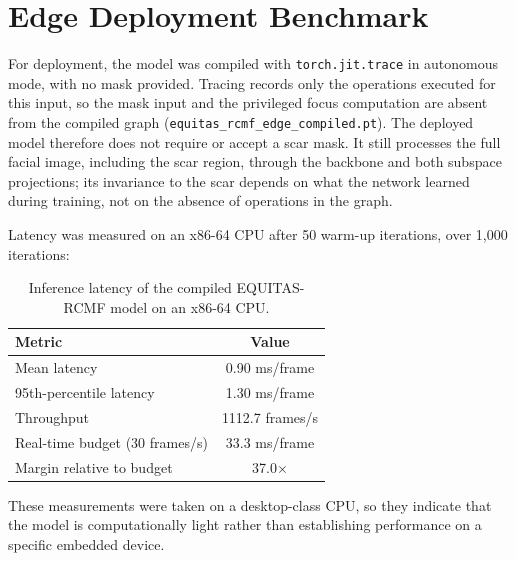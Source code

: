 \section{Edge Deployment Benchmark}
\label{sec:deployment}
For deployment, the model was compiled with \texttt{torch.jit.trace} in autonomous mode, with no mask provided. Tracing records only the operations executed for this input, so the mask input and the privileged focus computation are absent from the compiled graph (\texttt{equitas\_rcmf\_edge\_compiled.pt}). The deployed model therefore does not require or accept a scar mask. It still processes the full facial image, including the scar region, through the backbone and both subspace projections; its invariance to the scar depends on what the network learned during training, not on the absence of operations in the graph.

Latency was measured on an x86-64 CPU after 50 warm-up iterations, over 1,000 iterations:
\begin{table}[htbp]
\centering
\begin{tabular}{@{}lc@{}}
\toprule
\textbf{Metric} & \textbf{Value} \\
\midrule
Mean latency & 0.90 ms/frame \\
95th-percentile latency & 1.30 ms/frame \\
Throughput & 1112.7 frames/s \\
Real-time budget (30 frames/s) & 33.3 ms/frame \\
Margin relative to budget & 37.0$\times$ \\
\bottomrule
\end{tabular}
\caption{Inference latency of the compiled EQUITAS-RCMF model on an x86-64 CPU.}
\label{tab:latency}
\end{table}
These measurements were taken on a desktop-class CPU, so they indicate that the model is computationally light rather than establishing performance on a specific embedded device.

